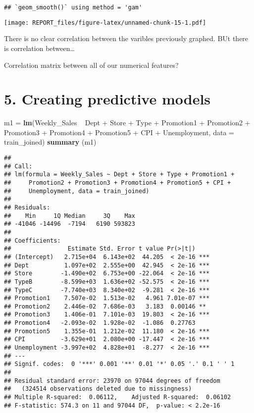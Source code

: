 \documentclass[11pt,]{article}
\newenvironment{Shaded}{\begin{snugshade}}{\end{snugshade}}
\newcommand{\KeywordTok}[1]{\textcolor[rgb]{0.13,0.29,0.53}{\textbf{{#1}}}}
\newcommand{\DataTypeTok}[1]{\textcolor[rgb]{0.13,0.29,0.53}{{#1}}}
\newcommand{\StringTok}[1]{\textcolor[rgb]{0.31,0.60,0.02}{{#1}}}
\newcommand{\NormalTok}[1]{{#1}}
\begin{document}
\begin{verbatim}
## `geom_smooth()` using method = 'gam'
\end{verbatim}

\texttt{[image: REPORT\_files/figure-latex/unnamed-chunk-15-1.pdf]}

There is no clear correlation between the varibles previously graphed.
BUt there is correlation between\ldots{}

Correlation matrix between all of our numerical features?

\section{5. Creating predictive
models}\label{creating-predictive-models}

\begin{Shaded}
\begin{Highlighting}[]
\NormalTok{m1 =}\StringTok{ }\KeywordTok{lm}\NormalTok{(Weekly_Sales ~}\StringTok{ }\NormalTok{Dept +}\StringTok{ }\NormalTok{Store +}\StringTok{ }\NormalTok{Type +}\StringTok{ }\NormalTok{Promotion1 +}\StringTok{ }\NormalTok{Promotion2 +}\StringTok{ }\NormalTok{Promotion3 +}\StringTok{ }\NormalTok{Promotion4 +}\StringTok{ }\NormalTok{Promotion5 +}\StringTok{ }\NormalTok{CPI +}\StringTok{ }\NormalTok{Unemployment, }\DataTypeTok{data =} \NormalTok{train_joined)}
\KeywordTok{summary} \NormalTok{(m1)}
\end{Highlighting}
\end{Shaded}

\begin{verbatim}
## 
## Call:
## lm(formula = Weekly_Sales ~ Dept + Store + Type + Promotion1 + 
##     Promotion2 + Promotion3 + Promotion4 + Promotion5 + CPI + 
##     Unemployment, data = train_joined)
## 
## Residuals:
##    Min     1Q Median     3Q    Max 
## -41046 -14496  -7194   6190 593823 
## 
## Coefficients:
##                Estimate Std. Error t value Pr(>|t|)    
## (Intercept)   2.715e+04  6.143e+02  44.205  < 2e-16 ***
## Dept          1.097e+02  2.555e+00  42.945  < 2e-16 ***
## Store        -1.490e+02  6.753e+00 -22.064  < 2e-16 ***
## TypeB        -8.599e+03  1.636e+02 -52.575  < 2e-16 ***
## TypeC        -7.740e+03  8.340e+02  -9.281  < 2e-16 ***
## Promotion1    7.507e-02  1.513e-02   4.961 7.01e-07 ***
## Promotion2    2.446e-02  7.686e-03   3.183  0.00146 ** 
## Promotion3    1.406e-01  7.101e-03  19.803  < 2e-16 ***
## Promotion4   -2.093e-02  1.928e-02  -1.086  0.27763    
## Promotion5    1.355e-01  1.212e-02  11.180  < 2e-16 ***
## CPI          -3.629e+01  2.080e+00 -17.447  < 2e-16 ***
## Unemployment -3.997e+02  4.828e+01  -8.277  < 2e-16 ***
## ---
## Signif. codes:  0 '***' 0.001 '**' 0.01 '*' 0.05 '.' 0.1 ' ' 1
## 
## Residual standard error: 23970 on 97044 degrees of freedom
##   (324514 observations deleted due to missingness)
## Multiple R-squared:  0.06112,    Adjusted R-squared:  0.06102 
## F-statistic: 574.3 on 11 and 97044 DF,  p-value: < 2.2e-16
\end{verbatim}
\end{document}
